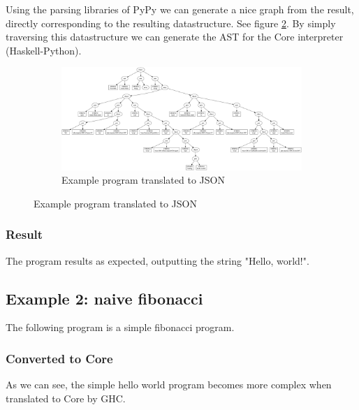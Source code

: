 Using the parsing libraries of PyPy we can generate a nice graph from the result,
directly corresponding to the resulting datastructure. 
See figure \ref{fig:helloworldgraph}.
By simply traversing this datastructure we can generate the AST for the Core 
interpreter (Haskell-Python).

\begin{figure}
\begin{figure}[H]
\includegraphics[width=\textwidth]{../interpreter/tests/helloworld.png}
\caption{Example program translated to JSON}
\label{fig:helloworldgraph}
\end{figure}
\end{figure}

\subsubsection{Result}

The program results as expected, outputting the string "Hello, world!".


\subsection{Example 2: naive fibonacci}

The following program is a simple fibonacci program.

\begin{footnotesize}

\end{footnotesize}

\subsubsection{Converted to Core}

As we can see, the simple hello world program becomes more complex when translated
to Core by GHC.

\begin{footnotesize}

\end{footnotesize}

